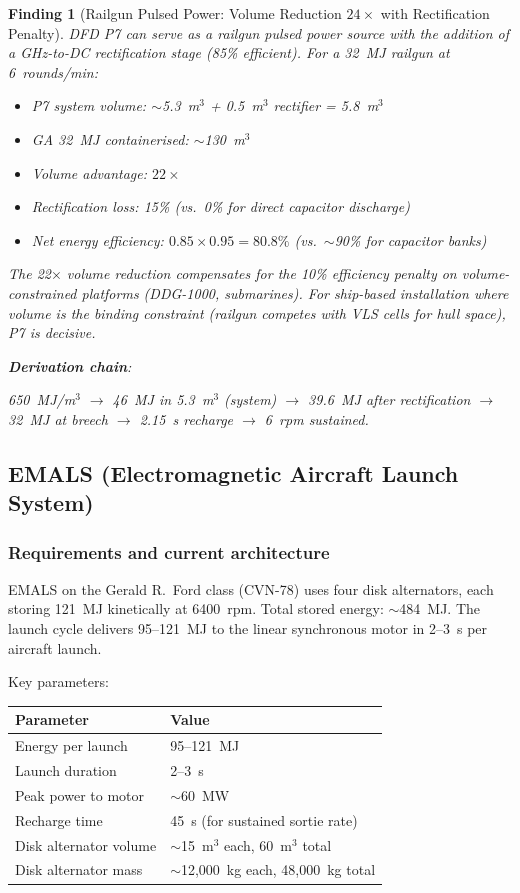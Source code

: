 \documentclass[11pt]{article}
\newtheorem{finding}{Finding}
\begin{document}
\begin{finding}[Railgun Pulsed Power: Volume Reduction $24\times$ with Rectification Penalty]
\label{find:railgun}
DFD P7 can serve as a railgun pulsed power source with the addition
of a GHz-to-DC rectification stage (85\% efficient). For a 32~MJ
railgun at 6~rounds/min:
\begin{itemize}[nosep]
  \item P7 system volume: $\sim$5.3~m$^3$ + 0.5~m$^3$ rectifier
    = 5.8~m$^3$
  \item GA 32~MJ containerised: $\sim$130~m$^3$
  \item Volume advantage: $22\times$
  \item Rectification loss: 15\% (vs.\ 0\% for direct capacitor discharge)
  \item Net energy efficiency: $0.85 \times 0.95 = 80.8\%$
    (vs.\ $\sim$90\% for capacitor banks)
\end{itemize}
The 22$\times$ volume reduction compensates for the 10\% efficiency
penalty on volume-constrained platforms (DDG-1000, submarines).
For ship-based installation where volume is the binding constraint
(railgun competes with VLS cells for hull space), P7 is decisive.

\textbf{Derivation chain}:
\begin{center}
650~MJ/m$^3$ $\to$ 46~MJ in 5.3~m$^3$ (system) $\to$ 39.6~MJ
after rectification $\to$ 32~MJ at breech $\to$ 2.15~s recharge
$\to$ 6~rpm sustained.
\end{center}
\end{finding}

\subsection{EMALS (Electromagnetic Aircraft Launch System)}

\subsubsection{Requirements and current architecture}

EMALS on the Gerald R.\ Ford class (CVN-78) uses four disk alternators,
each storing 121~MJ kinetically at 6400~rpm. Total stored energy:
$\sim$484~MJ. The launch cycle delivers 95--121~MJ to the linear
synchronous motor in 2--3~s per aircraft launch.

Key parameters:
\begin{center}
\begin{tabular}{ll}
\toprule
Parameter & Value \\
\midrule
Energy per launch & 95--121~MJ \\
Launch duration & 2--3~s \\
Peak power to motor & $\sim$60~MW \\
Recharge time & 45~s (for sustained sortie rate) \\
Disk alternator volume & $\sim$15~m$^3$ each, 60~m$^3$ total \\
Disk alternator mass & $\sim$12,000~kg each, 48,000~kg total \\
\bottomrule
\end{tabular}
\end{center}
\end{document}
